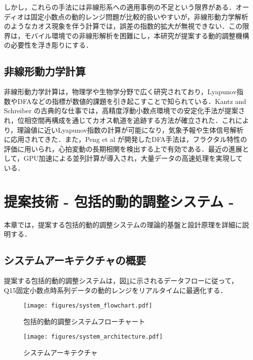 \documentclass[10pt,journal,compsoc]{IEEEtran}
\begin{document}
しかし，これらの手法には非線形系への適用事例の不足という限界がある．オーディオは固定小数点の動的レンジ問題が比較的扱いやすいが，非線形動力学解析のようなカオス現象を伴う計算では，誤差の指数的拡大が無視できない．この限界は，モバイル環境での非線形解析を困難にし，本研究が提案する動的調整機構の必要性を浮き彫りにする．

\subsection{非線形動力学計算}

非線形動力学計算は，物理学や生物学分野で広く研究されており，Lyapunov指数やDFAなどの指標が数値的課題を引き起こすことで知られている．Kantz and Schreiber \cite{kantz2004nonlinear}の古典的な仕事では，高精度浮動小数点環境での安定化手法が提案され，位相空間再構成\cite{takens1981detecting}を通じてカオス軌道を追跡する方法が確立された．これにより，理論値に近いLyapunov指数の計算が可能になり，気象予報や生体信号解析に応用されてきた．また，Peng et al \cite{peng1994mosaic}が開発したDFA手法は，フラクタル特性の評価に用いられ，心拍変動の長期相関を検出する上で有効である．最近の進展として，GPU加速による並列計算が導入され，大量データの高速処理を実現している．

\section{提案技術 - 包括的動的調整システム -}

本章では，提案する包括的動的調整システムの理論的基盤と設計原理を詳細に説明する．

\subsection{システムアーキテクチャの概要}

提案する包括的動的調整システムは，図\ref{fig:system_flow}に示されるデータフローに従って，Q15固定小数点時系列データの動的レンジをリアルタイムに最適化する．

\begin{figure}[htbp]
\centering
\texttt{[image: figures/system\_flowchart.pdf]}
\caption{包括的動的調整システムフローチャート}
\label{fig:system_flow}
\end{figure}

\begin{figure}[htbp]
\centering
\texttt{[image: figures/system\_architecture.pdf]}
\caption{システムアーキテクチャ}
\label{fig:system_arch}
\end{figure}
\end{document}
